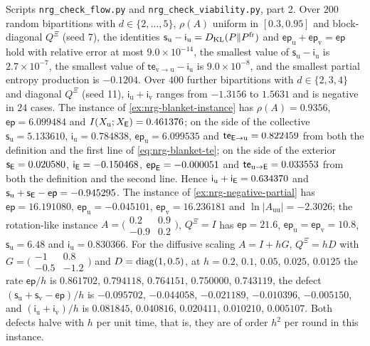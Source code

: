 \begin{numcheck}\label{chk:nrg-flow}
Scripts \texttt{nrg\_\allowbreak check\_\allowbreak flow.py} and \texttt{nrg\_\allowbreak check\_\allowbreak viability.py}, part 2. Over $200$ random bipartitions with $d\in\{2,\dots,5\}$, $\rho(A)$ uniform in $[0.3,0.95]$ and block-diagonal $Q^{\Xi}$ (seed 7), the identities $\mathsf s_{\mathrm u}-\mathsf i_{\mathrm u}=D_{\mathrm{KL}}(P\Vert P^{\mathrm{fr}})$ and $\mathsf{ep}_{\mathrm u}+\mathsf{ep}_{\mathrm v}=\mathsf{ep}$ hold with relative error at most $9.0\times10^{-14}$, the smallest value of $\mathsf s_{\mathrm u}-\mathsf i_{\mathrm u}$ is $2.7\times10^{-7}$, the smallest value of $\mathsf{te}_{\mathrm v\to\mathrm u}-\mathsf i_{\mathrm u}$ is $9.0\times10^{-8}$, and the smallest partial entropy production is $-0.1204$. Over $400$ further bipartitions with $d\in\{2,3,4\}$ and diagonal $Q^{\Xi}$ (seed 11), $\mathsf i_{\mathrm u}+\mathsf i_{\mathrm v}$ ranges from $-1.3156$ to $1.5631$ and is negative in $24$ cases. The instance of \cref{ex:nrg-blanket-instance} has $\rho(A)=0.9356$, $\mathsf{ep}=6.099484$ and $I(X_{\mathrm u};X_{\mathsf{E}})=0.461376$; on the side of the collective $\mathsf s_{\mathrm u}=5.133610$, $\mathsf i_{\mathrm u}=0.784838$, $\mathsf{ep}_{\mathrm u}=6.099535$ and $\mathsf{te}_{\mathsf{E}\to\mathrm u}=0.822459$ from both the definition and the first line of \cref{eq:nrg-blanket-te}; on the side of the exterior $\mathsf s_{\mathsf{E}}=0.020580$, $\mathsf i_{\mathsf{E}}=-0.150468$, $\mathsf{ep}_{\mathsf{E}}=-0.000051$ and $\mathsf{te}_{\mathrm u\to\mathsf{E}}=0.033553$ from both the definition and the second line. Hence $\mathsf i_{\mathrm u}+\mathsf i_{\mathsf{E}}=0.634370$ and $\mathsf s_{\mathrm u}+\mathsf s_{\mathsf{E}}-\mathsf{ep}=-0.945295$. The instance of \cref{ex:nrg-negative-partial} has $\mathsf{ep}=16.191080$, $\mathsf{ep}_{\mathrm u}=-0.045101$, $\mathsf{ep}_{\mathrm v}=16.236181$ and $\ln\vert A_{\mathrm{uu}}\vert=-2.3026$; the rotation-like instance $A=\bigl(\begin{smallmatrix}0.2&0.9\\-0.9&0.2\end{smallmatrix}\bigr)$, $Q^{\Xi}=I$ has $\mathsf{ep}=21.6$, $\mathsf{ep}_{\mathrm u}=\mathsf{ep}_{\mathrm v}=10.8$, $\mathsf s_{\mathrm u}=6.48$ and $\mathsf i_{\mathrm u}=0.830366$. For the diffusive scaling $A=I+hG$, $Q^{\Xi}=hD$ with $G=\bigl(\begin{smallmatrix}-1&0.8\\-0.5&-1.2\end{smallmatrix}\bigr)$ and $D=\operatorname{diag}(1,0.5)$, at $h=0.2$, $0.1$, $0.05$, $0.025$, $0.0125$ the rate $\mathsf{ep}/h$ is $0.861702$, $0.794118$, $0.764151$, $0.750000$, $0.743119$, the defect $(\mathsf s_{\mathrm u}+\mathsf s_{\mathrm v}-\mathsf{ep})/h$ is $-0.095702$, $-0.044058$, $-0.021189$, $-0.010396$, $-0.005150$, and $(\mathsf i_{\mathrm u}+\mathsf i_{\mathrm v})/h$ is $0.081845$, $0.040816$, $0.020411$, $0.010210$, $0.005107$. Both defects halve with $h$ per unit time, that is, they are of order $h^2$ per round in this instance.
\end{numcheck}

